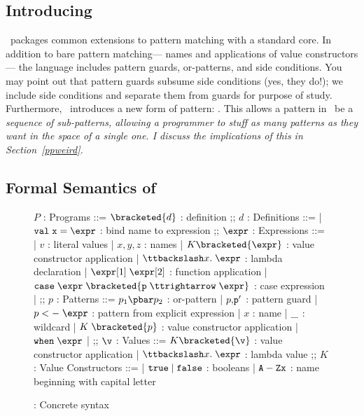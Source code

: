 \documentclass[manuscript,screen,review, 12pt, nonacm]{acmart}
\begin{document}
\subsection{Introducing \PPlus}
\label{pplus}

    \PPlus\ packages common extensions to pattern matching with a standard core.
    In addition to bare pattern matching— names and applications of value
    constructors— the language includes pattern guards, or-patterns, and side
    conditions. You may point out that pattern guards subsume side conditions
    (yes, they do!); we include side conditions and separate them from guards
    for purpose of study. Furthermore, \PPlus\ introduces a new form of pattern:
    \pcommap. This allows a pattern in \PPlus\ be a \it{sequence} of
    sub-patterns, allowing a programmer to stuff as many patterns as they want
    in the space of a single one. I discuss the implications of this in
    Section~\ref{ppweird}.

\subsection{Formal Semantics of \PPlus}

\begin{figure}
\begin{center}
\begin{bnf}
$P$ : \textsf{Programs} ::=
$\bracketed{d}$ : definition
;;
$d$ : \textsf{Definitions} ::=
| $\tt{val}\; x\; \tt{=}\; \expr$ : bind name to expression
;;
$\expr$ : Expressions ::= 
| $v$ : literal values 
| $x, y, z$ : names
| $K\bracketed{\expr}$ : value constructor application 
| $\ttbackslash x.\; \expr$ : lambda declaration  
| $\expr[1]\; \expr[2]$ : function application 
| $\tt{case}\; \expr\; \bracketed{p\; \ttrightarrow\; \expr}$ : case expression 
| \ttbraced{$\expr$}
;;
$p$ : \textsf{Patterns} ::= $p_{1}\pbar p_{2}$ : or-pattern
| $p \tt{,} p'$ : pattern guard 
| $p\; \tt{<-}\; \expr$ : pattern from explicit expression  
| $x$ : name 
| $\tt{\_}$ : wildcard 
| $K\; \bracketed{p}$ : value constructor application 
| $\tt{when}\; \expr$
| 
;;
$\v$ : Values ::= $K\bracketed{\v}$ : value constructor application 
| $\ttbackslash x.\; \expr$ : lambda value 
;;
$K$ : \textsf{Value Constructors} ::=
| $\tt{true}\; \vert\; \tt{false}$ : booleans
| $\tt{A-Z}x$ : name beginning with capital letter
\end{bnf}
\end{center}
\caption{\PPlus: Concrete syntax}
\label{fig:ppsyntax}
\end{figure}
\end{document}
